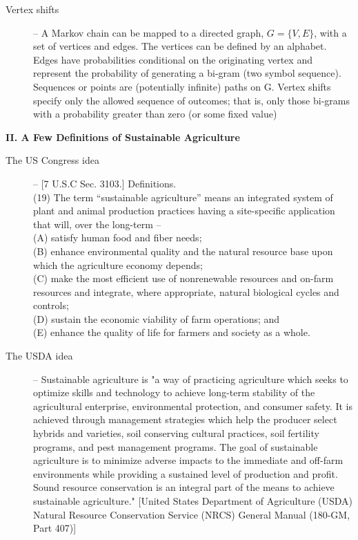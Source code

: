 \documentclass[12pt]{article}
\begin{document}
\begin{description}
	\item[Vertex shifts] -- A Markov chain can be mapped to a directed graph, $G = \{ V, E\} $, with a set of vertices and edges. The vertices can be defined by an alphabet. Edges have probabilities conditional on the originating vertex and represent the probability of generating a bi-gram (two symbol sequence). Sequences or points are (potentially infinite) paths on G. Vertex shifts specify only the allowed sequence of outcomes; that is, only those bi-grams  with a probability greater than zero (or some fixed value)
\end{description}
\vspace{5mm}
\centerline{\textbf{II. A Few Definitions of Sustainable Agriculture}}
\vspace{-2mm}
\begin{description}
	\item[The US Congress idea] -- [7 U.S.C Sec. 3103.] Definitions.\\
(19) The term “sustainable agriculture” means an integrated system of plant and animal production practices having a site-specific application that will, over the long-term --\\
(A) satisfy human food and fiber needs;\\
(B) enhance environmental quality and the natural resource base upon which the agriculture economy depends;\\
(C) make the most efficient use of nonrenewable resources and on-farm resources and integrate, where appropriate, natural biological cycles and controls;\\
(D) sustain the economic viability of farm operations; and\\
(E) enhance the quality of life for farmers and society as a whole.
\end{description}

\begin{description}
	\item[The USDA idea] -- Sustainable agriculture is "a way of practicing agriculture which seeks to optimize skills and technology to achieve long-term stability of  the agricultural enterprise, environmental protection, and consumer safety. It is achieved through management strategies which help the producer select hybrids and varieties, soil conserving cultural practices, soil fertility programs, and pest management programs. The goal of sustainable agriculture is to minimize adverse impacts to the immediate and off-farm environments while providing a sustained level of production and profit. Sound resource conservation is an integral part of the means to achieve sustainable agriculture." [United States Department of Agriculture (USDA) Natural Resource Conservation Service (NRCS) General Manual (180-GM, Part 407)]
\end{description}
\end{document}
